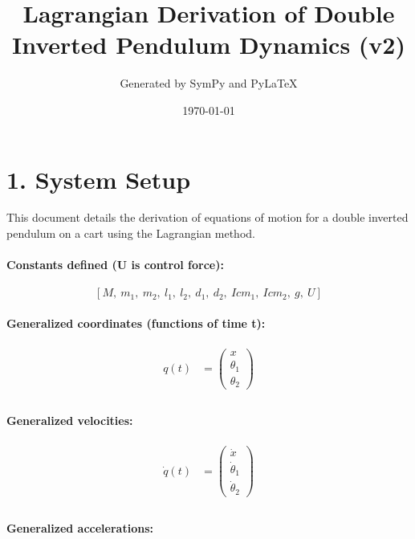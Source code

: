 \documentclass{article}%
\title{Lagrangian Derivation of Double Inverted Pendulum Dynamics (v2)}%
\author{Generated by SymPy and PyLaTeX}%
\date{\today}%
\begin{document}
%
\normalsize%
\maketitle%
\tableofcontents%
\newpage%
\section{1. System Setup}%
\label{sec:1.SystemSetup}%
This document details the derivation of equations of motion for a double inverted pendulum on a cart using the Lagrangian method.\newline%
%
\paragraph{Constants defined (U is control force):}%
\label{para:Constantsdefined(Uiscontrolforce)}%

%
\[%
\displaystyle \left[ M, \  m_{1}, \  m_{2}, \  l_{1}, \  l_{2}, \  d_{1}, \  d_{2}, \  Icm_{1}, \  Icm_{2}, \  g, \  U\right]%
\]%
\paragraph{Generalized coordinates (functions of time t):}%
\label{para:Generalizedcoordinates(functionsoftimet)}%

%
\begin{align*}%
q(t) &= \displaystyle \begin{pmatrix}x\\\theta_1\\\theta_2\end{pmatrix} \\%
\end{align*}%
\paragraph{Generalized velocities:}%
\label{para:Generalizedvelocities}%

%
\begin{align*}%
\dot{q}(t) &= \displaystyle \begin{pmatrix}\dot{x}\\\dot{\theta}_{1}\\\dot{\theta}_{2}\end{pmatrix} \\%
\end{align*}%
\paragraph{Generalized accelerations:}%
\label{para:Generalizedaccelerations}%
\end{document}
